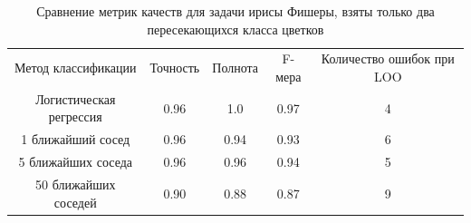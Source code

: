 \begin{table}[ht]
\caption{Сравнение метрик качеств для задачи ирисы Фишеры, взяты только два пересекающихся класса цветков}
\label{tab_weight}
\centering
    \begin{tabular}{|c|c|c|c|c|}
    \hline \multirow{3}{*}{\parbox{3.5cm}{Метод классификации}} & \multirow{3}{*}{Точность} & \multirow{3}{*}{Полнота} & \multirow{3}{*}{F-мера}  & \multirow{3}{*}{\parbox{3cm}{Количество ошибок при LOO}} \\
    & & & & \\
    & & & & \\    
    \hline \multirow{2}{*}{\parbox{3.5cm}{Логистическая регрессия}} & \multirow{2}{*}{0.96} & \multirow{2}{*}{1.0} & \multirow{2}{*}{0.97}  & \multirow{2}{*}{4} \\
    & & & & \\    
    \hline \multirow{2}{*}{\parbox{3.5cm}{1 ближайший сосед}} & \multirow{2}{*}{0.96} & \multirow{2}{*}{0.94} & \multirow{2}{*}{0.93}  & \multirow{2}{*}{6} \\
    & & & & \\ 
    \hline \multirow{2}{*}{\parbox{3.5cm}{5 ближайших соседа}} & \multirow{2}{*}{0.96} & \multirow{2}{*}{0.96} & \multirow{2}{*}{0.94}  & \multirow{2}{*}{5} \\
    & & & & \\ 
    \hline \multirow{2}{*}{\parbox{3.5cm}{50 ближайших соседей}} & \multirow{2}{*}{0.90} & \multirow{2}{*}{0.88} & \multirow{2}{*}{0.87}  & \multirow{2}{*}{9} \\
    & & & & \\     
    \hline
    \end{tabular}
\end{table}